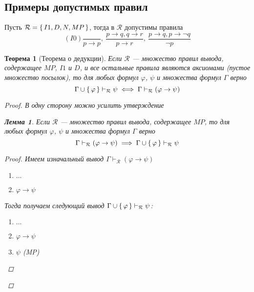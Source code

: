 \documentclass[12pt]{article}
\let\im\rightarrow
\let\n\neg
\let\un\cup
\theoremstyle{definition}
\theoremstyle{plain}
\newtheorem{theorem}{Теорема}[section]
\newtheorem{lemma}{Лемма}[section]
\theoremstyle{remark}
\begin{document}
\subsection{Примеры допустимых правил}
Пусть $\mathcal{R} = \set{I1, D, N, MP}$, тогда в $\mathcal{R}$
допустимы правила
\begin{displaymath}
  (I0)\frac{}{p \im p},\ \frac{p \im q, q \im r}{p \im r},\ \frac{p
  \im q, p \im \n q}{\n p}
\end{displaymath}

\begin{theorem}[Теорема о дедукции]
  Если $\mathcal{R}$ --- множество правил вывода, содержащее $MP$,
  $I1$ и $D$, и все остальные правила являются аксиомами (пустое
  множество посылок), то для любых формул $\varphi$, $\psi$ и
  множества формул $\Gamma$ верно
  \begin{displaymath}
    \Gamma \un \set{\varphi} \vdash_{\mathcal{R}} \psi \iff \Gamma
    \vdash_{\mathcal{R}} (\varphi \im \psi)
  \end{displaymath}
  \begin{proof}
    В одну сторону можно усилить утверждение

    \begin{lemma}
      Если $\mathcal{R}$ --- множество правил вывода, содержащее $MP$,
      то для любых формул $\varphi$, $\psi$ и множества формул $\Gamma$ верно
      \[
        \Gamma \vdash_{\mathcal{R}} (\varphi \im \psi) \implies \Gamma
        \un \set{\varphi} \vdash_{\mathcal{R}} \psi
      \]
      \begin{proof}
        Имеем изначальный вывод $\Gamma \vdash_{\mathcal{R}} (\varphi \im \psi)$
        \begin{enumerate}
          \item $\dots$

          \item $\varphi \im \psi$
        \end{enumerate}
        Тогда получаем следующий вывод $\Gamma \un \set{\varphi}
        \vdash_{\mathcal{R}} \psi$:
        \begin{enumerate}
          \item $\dots$

          \item $\varphi \im \psi$

          \item $\psi$ (MP)
        \end{enumerate}
      \end{proof}
    \end{lemma}


\end{proof}
\end{theorem}
\end{document}
